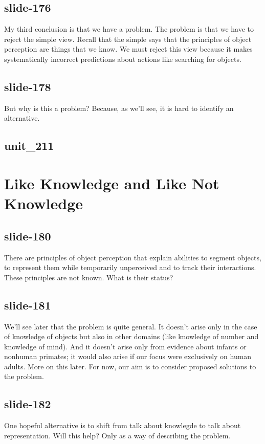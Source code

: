 \documentclass[12pt,\papersize]{extarticle}
\begin{document}
 
\subsection{slide-176}
My third conclusion is that we have a problem.
The problem is that we have to reject the simple view.
Recall that the simple says that the principles of object perception are things that we know.
We must reject this view because it makes systematically incorrect predictions about actions like searching for objects.
 
 
\subsection{slide-178}
But why is this a problem?
Because, as we'll see, it is hard to identify an alternative.
 
 
\subsection{unit\_211}
 
\section{Like Knowledge and Like Not Knowledge}
 
 
\subsection{slide-180}
There are principles of object perception that explain abilities to segment objects, to represent them while temporarily unperceived and to track their interactions.
These principles are not known. What is their status?
 
 
\subsection{slide-181}
We'll see later that the problem is quite general.
It doesn't arise only in the case of knowledge of objects but also in other domains (like knowledge of number and knowledge of mind).
And it doesn't arise only from evidence about infants or nonhuman primates; it would also arise if our focus were exclusively on human adults.
More on this later.
For now, our aim is to consider proposed solutions to the problem.
 
 
\subsection{slide-182}
One hopeful alternative is to shift from talk about knowlegde to talk about representation.
Will this help?
Only as a way of describing the problem.
 
\end{document}
